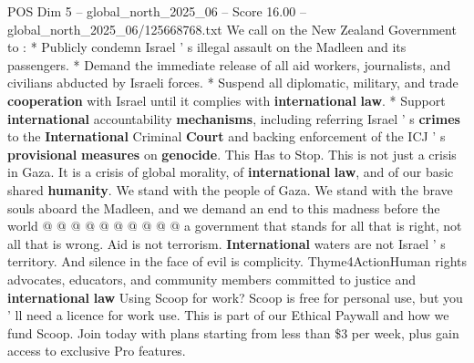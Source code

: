 \begin{textsample}{POS Dim 5 – global\_north\_2025\_06 – Score 16.00 – global\_north\_2025\_06/125668768.txt}
We call on the New Zealand Government to : * Publicly condemn Israel ' s illegal assault on the Madleen and its passengers. * Demand the immediate release of all aid workers, journalists, and civilians abducted by Israeli forces. * Suspend all diplomatic, military, and trade \textbf{cooperation} with Israel until it complies with \textbf{international} \textbf{law}. * Support \textbf{international} accountability \textbf{mechanisms}, including referring Israel ' s \textbf{crimes} to the \textbf{International} Criminal \textbf{Court} and backing enforcement of the ICJ ' s \textbf{provisional} \textbf{measures} on \textbf{genocide}.
This Has to Stop.
This is not just a crisis in Gaza.
It is a crisis of global morality, of \textbf{international} \textbf{law}, and of our basic shared \textbf{humanity}.
We stand with the people of Gaza.
We stand with the brave souls aboard the Madleen, and we demand an end to this madness before the world @ @ @ @ @ @ @ @ @ @ a government that stands for all that is right, not all that is wrong.
Aid is not terrorism. \textbf{International} waters are not Israel ' s territory.
And silence in the face of evil is complicity.
Thyme4ActionHuman rights advocates, educators, and community members committed to justice and \textbf{international} \textbf{law} Using Scoop for work?
Scoop is free for personal use, but you ' ll need a licence for work use.
This is part of our Ethical Paywall and how we fund Scoop.
Join today with plans starting from less than \$3 per week, plus gain access to exclusive Pro features.

\end{textsample}
